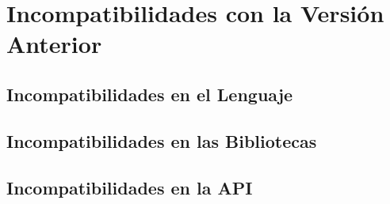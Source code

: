 \chapter{Incompatibilidades con la Versión Anterior}
\lipsum[1-2]

\section{Incompatibilidades en el Lenguaje}
\lipsum[1-2]

\section{Incompatibilidades en las Bibliotecas}
\lipsum[1-2]

\section{Incompatibilidades en la API}
\lipsum[1-2]
